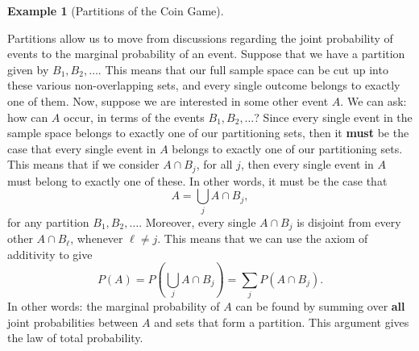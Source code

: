 \documentclass[
  letterpaper,
  DIV=11,
  numbers=noendperiod]{scrreprt}
\theoremstyle{definition}
\theoremstyle{definition}
\newtheorem{example}{Example}[chapter]
\theoremstyle{definition}
\theoremstyle{remark}
\begin{document}
\begin{example}[Partitions of the Coin
Game]
\begin{tcolorbox}[enhanced jigsaw, colback=white, colframe=quarto-callout-color-frame, arc=.35mm, leftrule=.75mm, rightrule=.15mm, opacityback=0, breakable, bottomrule=.15mm, left=2mm, toprule=.15mm]
\end{tcolorbox}

\end{example}

Partitions allow us to move from discussions regarding the joint
probability of events to the marginal probability of an event. Suppose
that we have a partition given by \(B_1, B_2, \dots\). This means that
our full sample space can be cut up into these various non-overlapping
sets, and every single outcome belongs to exactly one of them. Now,
suppose we are interested in some other event \(A\). We can ask: how can
\(A\) occur, in terms of the events \(B_1, B_2, \dots\)? Since every
single event in the sample space belongs to exactly one of our
partitioning sets, then it \textbf{must} be the case that every single
event in \(A\) belongs to exactly one of our partitioning sets. This
means that if we consider \(A\cap B_j\), for all \(j\), then every
single event in \(A\) must belong to exactly one of these. In other
words, it must be the case that \[A = \bigcup_{j} A\cap B_j,\] for any
partition \(B_1, B_2,\dots\). Moreover, every single \(A\cap B_j\) is
disjoint from every other \(A \cap B_\ell\), whenever \(\ell \neq j\).
This means that we can use the axiom of additivity to give
\[P(A) = P\left(\bigcup_{j} A\cap B_j\right) = \sum_{j} P(A \cap B_j).\]
In other words: the marginal probability of \(A\) can be found by
summing over \textbf{all} joint probabilities between \(A\) and sets
that form a partition. This argument gives the law of total probability.
\end{document}
